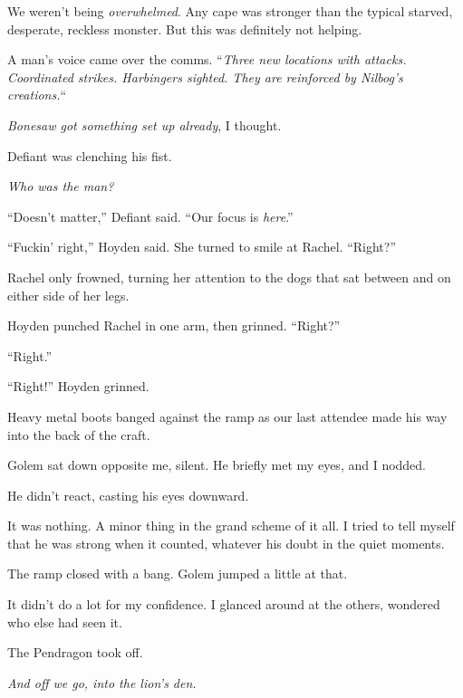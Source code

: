 We weren't being \emph{overwhelmed}.  Any cape was stronger than the typical starved, desperate, reckless monster.  But this was definitely not helping.



A man's voice came over the comms.  ``\emph{Three new locations with attacks.  Coordinated strikes.  Harbingers sighted.  They are reinforced by Nilbog's creations.}``



\emph{Bonesaw got something set up already}, I thought.



Defiant was clenching his fist.



\emph{Who was the man?}



``Doesn't matter,'' Defiant said.  ``Our focus is \emph{here}.''



``Fuckin' right,'' Hoyden said.  She turned to smile at Rachel.  ``Right?''



Rachel only frowned, turning her attention to the dogs that sat between and on either side of her legs.



Hoyden punched Rachel in one arm, then grinned. ``Right?''



``Right.''



``Right!''  Hoyden grinned.



Heavy metal boots banged against the ramp as our last attendee made his way into the back of the craft.



Golem sat down opposite me, silent.  He briefly met my eyes, and I nodded.



He didn't react, casting his eyes downward.



It was nothing.  A minor thing in the grand scheme of it all.  I tried to tell myself that he was strong when it counted, whatever his doubt in the quiet moments.



The ramp closed with a bang.  Golem jumped a little at that.



It didn't do a lot for my confidence.  I glanced around at the others, wondered who else had seen it.



The Pendragon took off.



\emph{And off we go, into the lion's den.}





